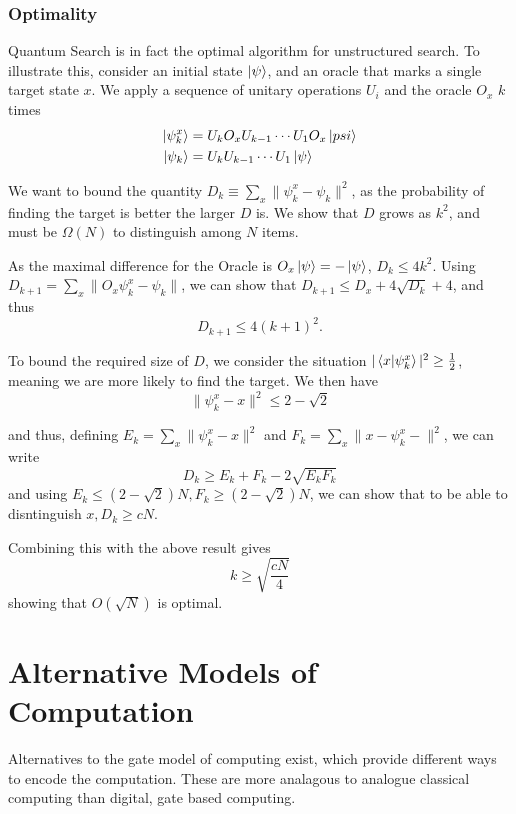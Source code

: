 \documentclass[11pt]{article}
\begin{document}
\subsubsection*{Optimality}
Quantum Search is in fact the optimal algorithm for unstructured search. To illustrate this, consider an initial state $\ket{\psi}$, and an oracle that marks a single target state $x$. We apply a sequence of unitary operations $U_{i}$ and the oracle $O_{x}$ $k$ times
\begin{align*}
  \ket{\psi_{k}^{x}}&=U_{k}O_{x}U_{k-1}\cdots U_{1}O_{x}\ket{psi}\\
  \ket{\psi_{k}} &= U_{k}U_{k-1}\cdots U_{1}\ket{\psi}
\end{align*}

We want to bound the quantity $D_{k}\equiv \sum_{x} \| \psi_{k}^{x}-\psi_{k}\|^{2}$, as the probability of finding the target is better the larger $D$ is. We show that $D$ grows as $k^{2}$, and must be $\Omega
(N)$ to distinguish among $N$ items.

As the maximal difference for the Oracle is $O_{x}\ket{\psi}=-\ket{\psi}$, $D_{k}\leq 4 k^{2}$. Using
$D_{k+1}=\sum_{x} \| O_{x}\psi_{k}^{x} - \psi_{k}\|$, we can show that $ D_{k+1}\leq D_{x} + 4\sqrt{D_{k}}+4$, and thus
\[ D_{k+1}\leq 4(k+1)^{2}.\]

To bound the required size of $D$, we consider the situation $\vert \braket{x}{\psi_{k}^{x}}\vert^{2}\geq\frac{1}{2}$, meaning we are more likely to find the target. We then have
\[\| \psi_{k}^{x}-x\|^{2}\leq 2-\sqrt{2}\]

and thus, defining $E_{k}=\sum_{x}\| \psi_{k}^{x}-x\|^{2}$ and $F_{k} = \sum_{x}\| x- \psi_{k}^{x}-\|^{2}$, we can write
\[
D_{k}\geq E_{k}+F_{k} -2\sqrt{E_{k}F_{k}}
\]
and using $E_{k}\leq(2-\sqrt{2})N,F_{k}\geq(2-\sqrt{2})N$, we can show that to be able to disntinguish $x, D_{k}\geq cN$.

Combining this with the above result gives
\begin{equation}
    k\geq\sqrt{\frac{cN}{4}}
\end{equation}
showing that $O(\sqrt{N})$ is optimal.

\section{Alternative Models of Computation}
Alternatives to the gate model of computing exist, which provide different ways to encode the computation. These are more analagous to analogue classical computing than digital, gate based computing.
\end{document}
